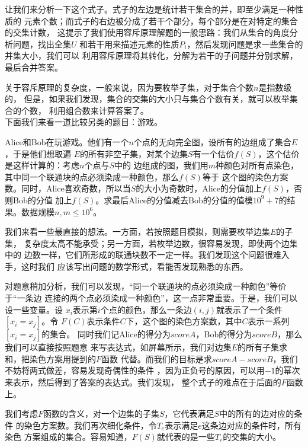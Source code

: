 \documentclass{noithesis}
\begin{document}
让我们来分析一下这个式子。式子的左边是统计若干集合的并，即至少满足一种性质的
元素个数；而式子的右边被分成了若干个部分，每个部分是在对特定的集合的交集计数，
这提示了我们使用容斥原理解题的一般思路：我们从集合的角度分析问题，找出全集$U$
和若干用来描述元素的性质$P_i$，然后发现问题是求一些集合的并集大小，我们可以
利用容斥原理将其转化，分解为若干的子问题并分别求解，最后合并答案。 \par

关于容斥原理的复杂度，一般来说，因为要枚举子集，对于集合个数$n$是指数级的，
但是，如果我们发现，集合的交集的大小只与集合个数有关，就可以枚举集合的个数，
利用组合数来计算答案了。 \\

下面我们来看一道比较另类的题目：游戏。 \par

Alice和Bob在玩游戏。他们有一个$n$个点的无向完全图，设所有的边组成了集合$E$，于是他们想取遍
$E$的所有非空子集，对某个边集$S$有一个估价$f(S)$，这个估价是这样计算的：考虑$n$个点与$S$中的
边组成的图，我们用$m$种颜色对所有点染色，其中同一个联通块的点必须染成一种颜色，那么$f(S)$等于
这个图的染色方案数。同时，Alice喜欢奇数，所以当$S$的大小为奇数时，Alice的分值加上$f(S)$，否则Bob的分值
加上$f(S)$。求最后Alice的分值减去Bob的分值的值模$10^9+7$的结果。数据规模$n,m \le 10^6$。 \par

我们来看一些最直接的想法。一方面，若按照题目模拟，则需要枚举边集$E$的子集，
复杂度太高不能承受；另一方面，若枚举边数，很容易发现，即使两个边集中的
边数一样，它们所形成的联通块数不一定一样。我们发现这个问题很难入手，这时我们
应该写出问题的数学形式，看能否发现熟悉的东西。 \par

对题意稍加分析，我们可以发现，“同一个联通块的点必须染成一种颜色”等价于“一条边
连接的两个点必须染成一种颜色”，这一点非常重要。于是，我们可以设一些变量。设
$x_i$表示第$i$个点的颜色，那么一条边$(i,j)$就表示了一个条件$[x_i=x_j]$。令
$F(C)$表示条件$C$下，这个图的染色方案数，其中$C$表示一系列$[x_i=x_j]$的集合。
同时我们记Alice的得分为$scoreA$，Bob的得分为$scoreB$，那么我们可以直接按照题意
来写表达式，如屏幕所示，我们对边集$E$的所有子集求和，把染色方案用提到的$F$函数
代替。而我们的目标是求$scoreA-scoreB$，我们不妨将两式做差，容易发现奇偶性的条件
，因为正负号的原因，可以用$-1$的幂次来表示，然后得到了答案的表达式。我们发现，
整个式子的难点在于后面的$F$函数上。 \par

我们考虑$F$函数的含义，对一个边集的子集$S$，它代表满足$S$中的所有的边对应的条件
的染色方案数。我们再次细化条件，令$T_e$表示满足$e$这条边对应的条件时，所有染色
方案组成的集合。容易知道，$F(S)$就代表的是一些$T_e$的交集的大小。 \par
\end{document}
